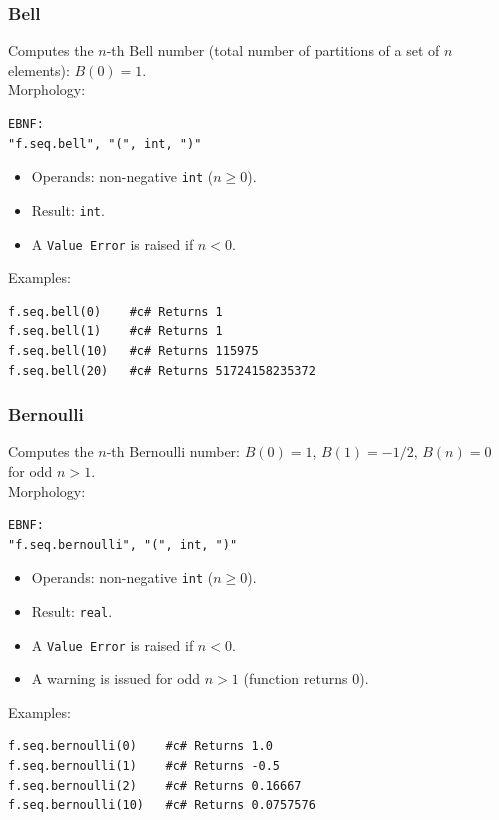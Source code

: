 \subsubsection{Bell}
Computes the $n$-th Bell number (total number of partitions of a set of $n$ elements): $B(0) = 1$.\\
Morphology:
\begin{verbatim}
EBNF:
"f.seq.bell", "(", int, ")"
\end{verbatim}
\begin{itemize}
\item Operands: non-negative \texttt{int} ($n \geq 0$).
\item Result: \texttt{int}.
\item A \texttt{Value Error} is raised if $n < 0$.
\end{itemize}
Examples:
\begin{verbatim}
f.seq.bell(0)    #c# Returns 1
f.seq.bell(1)    #c# Returns 1
f.seq.bell(10)   #c# Returns 115975
f.seq.bell(20)   #c# Returns 51724158235372
\end{verbatim}

\subsubsection{Bernoulli}
Computes the $n$-th Bernoulli number: $B(0) = 1$, $B(1) = -1/2$, $B(n) = 0$ for odd $n > 1$.\\
Morphology:
\begin{verbatim}
EBNF:
"f.seq.bernoulli", "(", int, ")"
\end{verbatim}
\begin{itemize}
\item Operands: non-negative \texttt{int} ($n \geq 0$).
\item Result: \texttt{real}.
\item A \texttt{Value Error} is raised if $n < 0$.
\item A warning is issued for odd $n > 1$ (function returns 0).
\end{itemize}
Examples:
\begin{verbatim}
f.seq.bernoulli(0)    #c# Returns 1.0
f.seq.bernoulli(1)    #c# Returns -0.5
f.seq.bernoulli(2)    #c# Returns 0.16667
f.seq.bernoulli(10)   #c# Returns 0.0757576
\end{verbatim}

